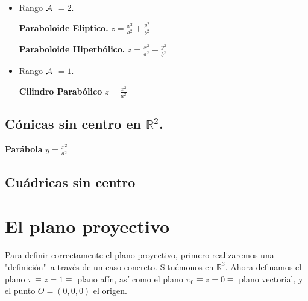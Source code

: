 \documentclass[11pt, a4paper]{article}
\newif\IfInSansMode
\let\oldsf\sffamily
\renewcommand*{\sffamily}{\oldsf\mathversion{sans}\InSansModetrue}
\theoremstyle{theorem-style}
\theoremstyle{definition-style}
\theoremstyle{remark-style}
\theoremstyle{example-style}
\begin{document}
\begin{itemize}

\item {Rango $\cal A$ $=2$.}



{\bf Paraboloide El\'iptico.}    \hspace{2.7cm}   $z = \frac{x^2}{a^2} + \frac{y^2}{b^2}$

\vspace{.2cm}

{\bf Paraboloide Hiperb\'olico.}    \hspace{2cm}   $z = \frac{x^2}{a^2} - \frac{y^2}{b^2}$



\vspace{0.5cm}

\item {Rango $\cal A$ $=1$.}


{\bf Cilindro Parab\'olico}    \hspace{3.3cm}   $z = \frac{x^2}{a^2}$ 

\end{itemize}

\subsection{\bf C\'onicas sin centro en $\mathbb{R}^2$.}



{\bf Par\'abola} \hspace{5.5cm}  $y = \frac{x^2}{a^2}$



\subsection{Cuádricas sin centro}

\newpage

\section{El plano proyectivo}

Para definir correctamente el plano proyectivo, primero realizaremos una "definición"\ a través de un caso concreto. Situémonos en $\mathbb{R}^3$. Ahora definamos el plano $\pi \equiv z = 1 \equiv$ plano afín, así como el plano $\pi_0 \equiv z = 0 \equiv$ plano vectorial, y el punto $O = (0,0,0)$ el origen.
\end{document}
